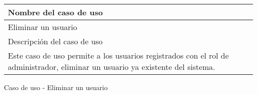 \begin{identificacionCasoDeUso}
	\begin{tabular} { | p{17cm} |}

		\hline
		Nombre del caso de uso                                                                                                         \\ \hline
		Eliminar un usuario                                                                                                            \\ \hline
		Descripción del caso de uso                                                                                                    \\ \hline
		Este caso de uso permite a los usuarios registrados con el rol de administrador, eliminar un usuario ya existente del sistema. \\ \hline
	\end{tabular}
	\caption{Caso de uso - Eliminar un usuario}
\end{identificacionCasoDeUso}